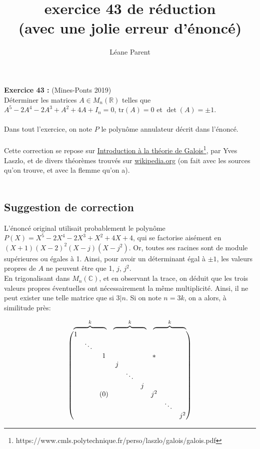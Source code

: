 \documentclass[a4paper, 12pt]{article}
\title{ exercice 43 de réduction \\
	\large (avec une jolie erreur d'énoncé) }
\author{Léane Parent}
\begin{document}
	
	\maketitle
	\textbf{Exercice 43 : } (Mines-Ponts 2019) \\
	Déterminer les matrices $ A \in M_n (\mathbb R) $ telles que $A^5 -2A^4 -2A^3 +A^2 +4A+I_n = 0$, $\mathrm{tr} (A) = 0$ et $\det (A) = \pm 1$.
	\\ \\
	Dans tout l'exercice, on note $P$ le polynôme annulateur décrit dans l'énoncé. \\ \\
	Cette correction se repose sur \underline{Introduction à la théorie de Galois}\footnote{https://www.cmls.polytechnique.fr/perso/laszlo/galois/galois.pdf}, par Yves Laszlo, et de divers théorèmes trouvés sur \url{wikipedia.org} (on fait avec les sources qu'on trouve, et avec la flemme qu'on a).
	\\ \\
	\subsection{Suggestion de correction}
	L'énoncé original utilisait probablement le polynôme $ P(X) = X^5 -2X^4 -2X^3 + X^2 + 4X + 4 $, qui se factorise aisément en $ (X+1)(X-2)^2(X-j)(X-j^2) $. Or, toutes ses racines sont de module supérieures ou égales à 1. Ainsi, pour avoir un déterminant égal à $\pm 1$, les valeurs propres de $A$ ne peuvent être que 1, $j$, $j^2$. \\
	En trigonalisant dans $ M_n (\mathbb C) $, et en observant la trace, on déduit que les trois valeurs propres éventuelles ont nécessairement la même multiplicité. Ainsi, il ne peut exister une telle matrice que si $3 | n$.
	Si on note $n=3k$, on a alors, à similitude près:
	
	$$
	\begin{array}{c}
		\begin{array}{ccc}
			\overbrace{\hphantom{\begin{array}{ccc}x&x&x\end{array}}}^{k}
			&
			\overbrace{\hphantom{\begin{array}{ccc}x&x&x\end{array}}}^{k}
			&
			\overbrace{\hphantom{\begin{array}{ccc}x&x&x\end{array}}}^{k}
		\end{array}
		\\[-0.3em]
		\begin{pmatrix}
			1 \\
			& \ddots \\
			& & 1 & & & & * \\
			& & & j \\
			& & & & \ddots \\
			& & & & & j \\
			& & (0) & & & & j^2 \\
			& & & & & & & \ddots \\
			& & & & & & & & j^2
		\end{pmatrix}
	\end{array}
	$$
	
\end{document}
